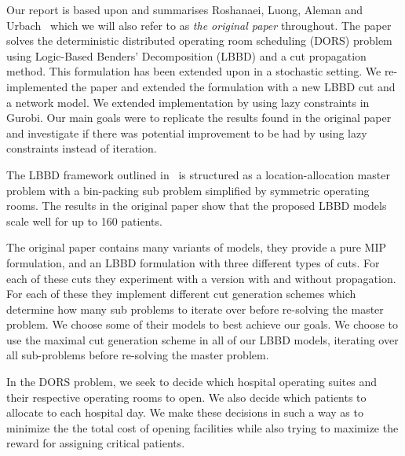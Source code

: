 Our report is based upon and summarises Roshanaei, Luong, Aleman and Urbach~\cite{roshanaei2017propagating} which we will also refer to as \textit{the original paper} throughout. The paper solves the deterministic distributed  operating room scheduling (DORS) problem using Logic-Based Benders' Decomposition (LBBD) and a cut propagation method. This formulation has been extended upon in a stochastic setting\cite{guo}. We re-implemented the paper and extended the formulation with a new LBBD cut and a network model. We extended implementation by using lazy constraints in Gurobi. Our main goals were to replicate the results found in the original paper and investigate if there was potential improvement to be had by using lazy constraints instead of iteration.

The LBBD framework outlined in~\cite{roshanaei2017propagating} is structured as a location-allocation master problem with a bin-packing sub problem simplified by symmetric operating rooms. The results in the original paper show that the proposed LBBD models scale well for up to 160 patients.

The original paper contains many variants of models, they provide a pure MIP formulation, and an LBBD formulation with three different types of cuts. For each of these cuts they experiment with a version with and without propagation. For each of these they implement different cut generation schemes which determine how many sub problems to iterate over before re-solving the master problem. We choose some of their models to best achieve our goals. We choose to use the maximal cut generation scheme in all of our LBBD models, iterating over all sub-problems before re-solving the master problem.

In the DORS problem, we seek to decide which hospital operating suites and their respective operating rooms to open. We also decide which patients to allocate to each hospital day. We make these decisions in such a way as to minimize the the total cost of opening facilities while also trying to maximize the reward for assigning critical patients\cite{roshanaei2017propagating}.